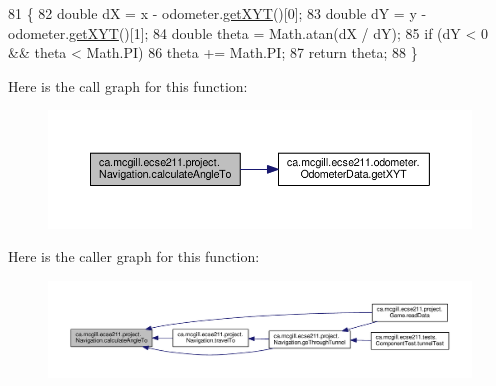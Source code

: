 \begin{DoxyCode}
81                                                      \{
82     \textcolor{keywordtype}{double} dX = x - odometer.\hyperlink{classca_1_1mcgill_1_1ecse211_1_1odometer_1_1_odometer_data_a8f40f0264c68f0cbed4fff1723ae7863}{getXYT}()[0];
83     \textcolor{keywordtype}{double} dY = y - odometer.\hyperlink{classca_1_1mcgill_1_1ecse211_1_1odometer_1_1_odometer_data_a8f40f0264c68f0cbed4fff1723ae7863}{getXYT}()[1];
84     \textcolor{keywordtype}{double} theta = Math.atan(dX / dY);
85     \textcolor{keywordflow}{if} (dY < 0 && theta < Math.PI)
86       theta += Math.PI;
87     \textcolor{keywordflow}{return} theta;
88   \}
\end{DoxyCode}
Here is the call graph for this function\+:\nopagebreak
\begin{figure}[H]
\begin{center}
\leavevmode
\includegraphics[width=350pt]{classca_1_1mcgill_1_1ecse211_1_1project_1_1_navigation_a4376e54162df8f123ca3b52e4fd2f38d_cgraph}
\end{center}
\end{figure}
Here is the caller graph for this function\+:\nopagebreak
\begin{figure}[H]
\begin{center}
\leavevmode
\includegraphics[width=350pt]{classca_1_1mcgill_1_1ecse211_1_1project_1_1_navigation_a4376e54162df8f123ca3b52e4fd2f38d_icgraph}
\end{center}
\end{figure}
\mbox{\label{classca_1_1mcgill_1_1ecse211_1_1project_1_1_navigation_ac9e260bcd619ffa4820d7d0de7ea1c12}} 
